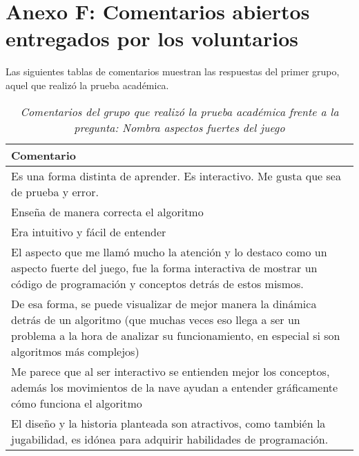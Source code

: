 \chapter*{Anexo F: Comentarios abiertos entregados por los voluntarios}\label{AnexoF}


Las siguientes tablas de comentarios muestran las respuestas del primer grupo, aquel que realizó la prueba académica.

\begin{table}[h]
   \centering
   \caption*{\textit{Comentarios del grupo que realizó la prueba académica frente a la pregunta: Nombra aspectos fuertes del juego}}
   \begin{tabular}{|p{\linewidth}|}
   \hline
   \textbf{Comentario} \\\hline
   Es una forma distinta de aprender. Es interactivo. Me gusta que sea de prueba y error. \\\hline
   Enseña de manera correcta el algoritmo \\\hline
   Era intuitivo y fácil de entender \\\hline
   El aspecto que me llamó mucho la atención y lo destaco como un aspecto fuerte del juego, fue la forma interactiva de mostrar un código de programación y conceptos detrás de estos mismos. \\\hline
   
   De esa forma, se puede visualizar de mejor manera la dinámica detrás de un algoritmo (que muchas veces eso llega a ser un problema a la hora de analizar su funcionamiento, en especial si son algoritmos más complejos) \\\hline
   Me parece que al ser interactivo se entienden mejor los conceptos, además los movimientos de la nave ayudan a entender gráficamente cómo funciona el algoritmo \\\hline
   El diseño y la historia planteada son atractivos, como también la jugabilidad, es idónea para adquirir habilidades de programación. \\\hline
   

\end{tabular}
\end{table}
